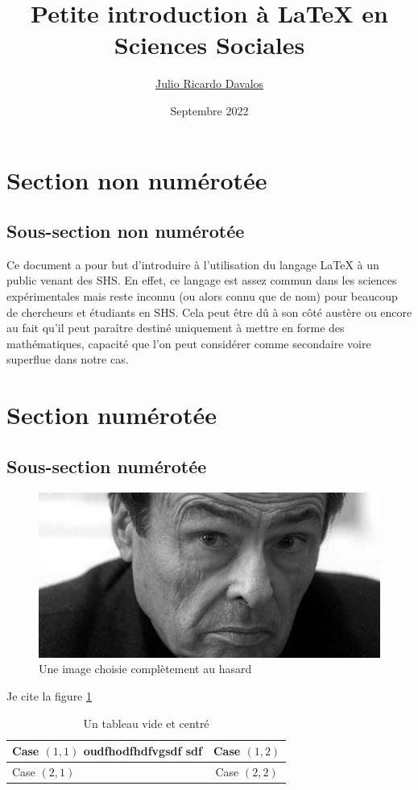 \documentclass[a4paper, 10pt]{article}\usepackage[]{graphicx}\usepackage[]{xcolor}
\author{\href{mailto:julioricardo.davalos@ehess.fr}{Julio Ricardo Davalos}}
\title{Petite introduction à \LaTeX{} en Sciences Sociales}
\date{Septembre 2022}
\begin{document}
\maketitle
\tableofcontents

\section*{Section non numérotée}
\subsection*{Sous-section non numérotée}
Ce document a pour but d'introduire à l'utilisation du langage \LaTeX{} à un public venant des SHS. En effet, ce langage est assez commun dans les sciences expérimentales mais reste inconnu (ou alors connu que de nom) pour beaucoup de chercheurs et étudiants en SHS. Cela peut être dû à son côté austère ou encore au fait qu'il peut paraître destiné uniquement à mettre en forme des mathématiques, capacité que l'on peut considérer comme secondaire voire superflue dans notre cas.

\section{Section numérotée}
\subsection{Sous-section numérotée}


\begin{figure}[!ht]
	\caption{Une image choisie complètement au hasard}\label{bourdieu}
	\centering
	\includegraphics[scale=0.4]{Images/bourdieu.jpg}
\end{figure}
Je cite la figure \ref{bourdieu}

  \begin{table}[!ht]
    \caption{Un tableau vide et centré}
    \centering
    \begin{tabular}{|l|c|}
    \hline
    Case $(1,1)$ oudfhodfhdfvgsdf sdf & Case $(1,2)$ \\
    \hline
     Case $(2,1)$ & Case $(2,2)$ \\
    \hline
    \end{tabular}
  \end{table}
  
\end{document}
